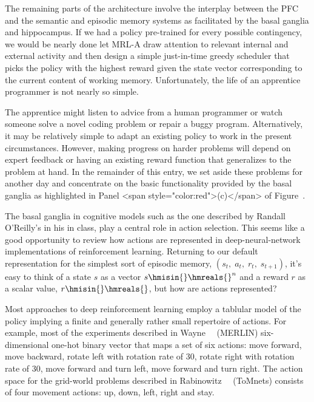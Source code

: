 
The remaining parts of the architecture involve the interplay between the PFC and the semantic and episodic memory systems as facilitated by the basal ganglia and hippocampus. If we had a policy pre-trained for every possible contingency, we would be nearly done \emdash{} let MRL-A draw attention to relevant internal and external activity and then design a simple just-in-time greedy scheduler that picks the policy with the highest reward given the state vector corresponding to the current content of working memory. Unfortunately, the life of an apprentice programmer is not nearly so simple.

The apprentice might listen to advice from a human programmer or watch someone solve a novel coding problem or repair a buggy program. Alternatively, it may be relatively simple to adapt an existing policy to work in the present circumstances. However, making progress on harder problems will depend on expert feedback or having an existing reward function that generalizes to the problem at hand. In the remainder of this entry, we set aside these problems for another day and concentrate on the basic functionality provided by the basal ganglia as highlighted in Panel {\rawhtml<span style="color:red">(c)</span>\endrawhtml} \emdash{} of Figure~{}.

The basal ganglia in cognitive models such as the one described by Randall O'Reilly's in his {} in class, play a central role in action selection. This seems like a good opportunity to review how actions are represented in deep-neural-network implementations of reinforcement learning. Returning to our default representation for the simplest sort of episodic memory, $(s_{t},\;a_{t},\;r_{t},\;s_{t+1})$, it’s easy to think of a state $s$ as a vector $s \hmisin{} \hmreals{}^{n}$ and a reward $r$ as a scalar value, $r \hmisin{} \hmreals{}$, but how are actions represented?

Most approaches to deep reinforcement learning employ a tablular model of the policy implying a finite \emdash{} and generally rather small \emdash{} repertoire of actions. For example, most of the experiments described in Wayne~\etal{}~\cite{WayneetalCoRR-18} (MERLIN) six-dimensional one-hot binary vector that maps a set of six actions: move forward, move backward, rotate left with rotation rate of 30, rotate right with rotation rate of 30, move forward and turn left, move forward and turn right. The action space for the grid-world problems described in Rabinowitz~\etal{}~\cite{RabinowitzetalCoRR-18} (ToMnets) consists of four movement actions: up, down, left, right and stay.

